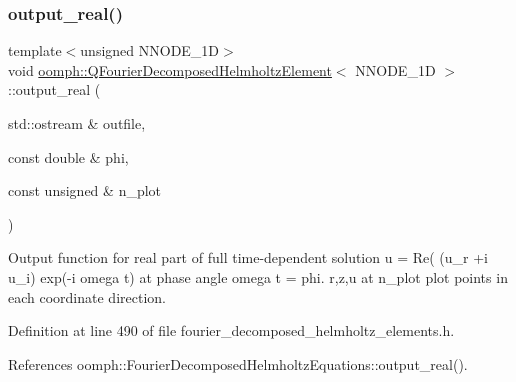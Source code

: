 \subsubsection{\texorpdfstring{output\+\_\+real()}{output\_real()}}
{\footnotesize\ttfamily template$<$unsigned N\+N\+O\+D\+E\+\_\+1D$>$ \\
void \hyperlink{classoomph_1_1QFourierDecomposedHelmholtzElement}{oomph\+::\+Q\+Fourier\+Decomposed\+Helmholtz\+Element}$<$ N\+N\+O\+D\+E\+\_\+1D $>$\+::output\+\_\+real (\begin{DoxyParamCaption}\item[{std\+::ostream \&}]{outfile,  }\item[{const double \&}]{phi,  }\item[{const unsigned \&}]{n\+\_\+plot }\end{DoxyParamCaption})\hspace{0.3cm}{\ttfamily [inline]}}



Output function for real part of full time-\/dependent solution u = Re( (u\+\_\+r +i u\+\_\+i) exp(-\/i omega t) at phase angle omega t = phi. r,z,u at n\+\_\+plot plot points in each coordinate direction. 



Definition at line 490 of file fourier\+\_\+decomposed\+\_\+helmholtz\+\_\+elements.\+h.



References oomph\+::\+Fourier\+Decomposed\+Helmholtz\+Equations\+::output\+\_\+real().

\mbox{\label{classoomph_1_1QFourierDecomposedHelmholtzElement_a528a56fd0948252c8886e7d559cb134f}} 
